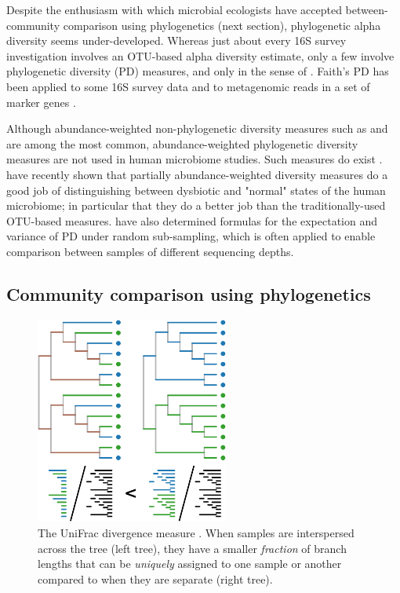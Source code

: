 \documentclass{amsart}
\newcommand{\forarxiv}[1]{#1}
\begin{document}
Despite the enthusiasm with which microbial ecologists have accepted between-community comparison using phylogenetics (next section), phylogenetic alpha diversity seems under-developed.
Whereas just about every 16S survey investigation involves an OTU-based alpha diversity estimate, only a few involve phylogenetic diversity (PD) measures, and only in the sense of \citet{faith1992conservation}.
Faith's PD has been applied to some 16S survey data \citep{lozupone2007global,costello2009bacterial} and to metagenomic reads in a set of marker genes \citep{kembel2011phylogenetic}.

Although abundance-weighted non-phylogenetic diversity measures such as \citet{simpson1949measurement} and \citet{shannon1948mathematical} are among the most common, abundance-weighted phylogenetic diversity measures are not used in human microbiome studies.
Such measures do exist \citep{rao1982diversity,barker2002phylogenetic,allen2009new,chao2010phylogenetic,vellend2011measuring}.
\citet{mccoy2013abundance} have recently shown that partially abundance-weighted diversity measures do a good job of distinguishing between dysbiotic and "normal" states of the human microbiome; in particular that they do a better job than the traditionally-used OTU-based measures.
\citet{nipperess2013mean} have also determined formulas for the expectation and variance of PD under random sub-sampling, which is often applied to enable comparison between samples of different sequencing depths.

\subsection{Community comparison using phylogenetics}

\newcommand{\unifracLegend}{
    The UniFrac divergence measure \citep[figure adapted from][]{LozuponeKnightUniFrac05}.
    When samples are interspersed across the tree (left tree), they have a smaller \textit{fraction} of branch lengths that can be \textit{uniquely} assigned to one sample or another compared to when they are separate (right tree).
}
\forarxiv{
\begin{figure}
  \capstart
  \vspace{-19pt}
  \begin{center}
    \includegraphics[width=2.5in]{figures/unifrac.pdf}
  \end{center}
  \vspace{-10pt}
  \caption{\unifracLegend}
  \label{fig:unifrac}
\end{figure}
}
\end{document}
